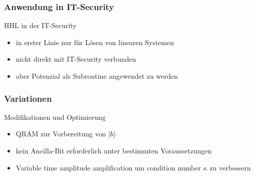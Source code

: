 \begin{frame}
    \frametitle{Anwendung in IT-Security}


    HHL in der IT-Security
    \begin{itemize}
        \item in erster Linie nur für Lösen von linearen Systemen
        \item nicht direkt mit IT-Security verbunden
        \item aber Potenzial als Subroutine angewendet zu werden
    \end{itemize}

    \hfil


\end{frame}

\begin{frame}
    \frametitle{Variationen}

    Modifikationen und Optimierung
    \begin{itemize}[<+->]
        \item QRAM zur Vorbereitung von $\ket{b}$
        \item kein Ancilla-Bit erforderlich unter bestimmten Voraussetzungen 
        \item Variable time amplitude amplification um condition number $\kappa$ zu verbessern
    \end{itemize}
    
\end{frame}

